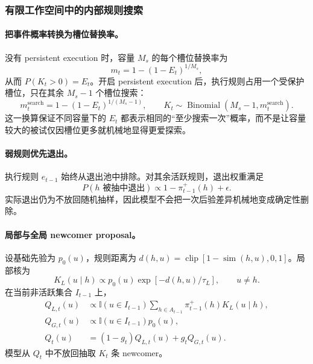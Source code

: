 \subsubsection{有限工作空间中的内部规则搜索}

\paragraph{把事件概率转换为槽位替换率。}
没有 persistent execution 时，容量 $M_s$ 的每个槽位替换率为
\begin{equation}
m_t=1-(1-E_t)^{1/M_s},
\label{eq:model0811-event-to-slot}
\end{equation}
从而 $P(K_t>0)=E_t$。开启 persistent execution 后，执行规则占用一个受保护槽位，只在其余 $M_s-1$ 个槽位搜索：
\begin{equation}
m_t^{\mathrm{search}}
=1-(1-E_t)^{1/(M_s-1)},
\qquad
K_t\sim\operatorname{Binomial}(M_s-1,m_t^{\mathrm{search}}).
\label{eq:model0811-protected-search}
\end{equation}
这一换算保证不同容量下的 $E_t$ 都表示相同的“至少搜索一次”概率，而不是让容量较大的被试仅因槽位更多就机械地显得更爱探索。

\paragraph{弱规则优先退出。}
执行规则 $e_{t-1}$ 始终从退出池中排除。对其余活跃规则，退出权重满足
\begin{equation}
P(h\text{ 被抽中退出})
\propto 1-\pi^+_{t-1}(h)+\epsilon.
\label{eq:model0811-drop-rule}
\end{equation}
实际退出仍为不放回随机抽样，因此模型不会把一次后验差异机械地变成确定性删除。

\paragraph{局部与全局 newcomer proposal。}
设基础先验为 $p_0(u)$，规则距离为
$d(h,u)=\operatorname{clip}[1-\operatorname{sim}(h,u),0,1]$。局部核为
\begin{equation}
K_L(u\mid h)
\propto p_0(u)\exp[-d(h,u)/\tau_L],
\qquad u\ne h.
\label{eq:model0811-local-kernel}
\end{equation}
在当前非活跃集合 $I_{t-1}$ 上，
\begin{align}
Q_{L,t}(u)
&\propto
\mathbb I(u\in I_{t-1})
\sum_{h\in A_{t-1}}\pi^+_{t-1}(h)K_L(u\mid h),
\nonumber\\
Q_{G,t}(u)
&\propto\mathbb I(u\in I_{t-1})p_0(u),
\nonumber\\
Q_t(u)
&=(1-g_t)Q_{L,t}(u)+g_tQ_{G,t}(u).
\label{eq:model0811-newcomer-proposal}
\end{align}
模型从 $Q_t$ 中不放回抽取 $K_t$ 条 newcomer。

